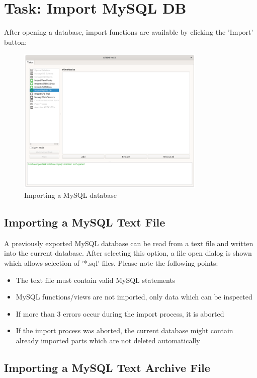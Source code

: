 \section{Task: Import MySQL DB}
\label{sec:task_import_mysql_db}

After opening a database, import functions are available by clicking the 'Import' button:

\begin{figure}[H]
  \center
    \includegraphics[width=9cm,frame]{../screenshots/database_import.png}
  \caption{Importing a MySQL database}
\end{figure}

\subsection{Importing a MySQL Text File}

A previously exported MySQL database can be read from a text file and written into the current database. After selecting this option, a file open dialog is shown which allows selection of '*.sql' files. Please note the following points:

\begin{itemize}  
\item The text file must contain valid MySQL statements
\item MySQL functions/views are not imported, only data which can be inspected
\item If more than 3 errors occur during the import process, it is aborted
\item If the import process was aborted, the current database might contain already imported parts which are not deleted automatically
\end{itemize}

\subsection{Importing a MySQL Text Archive File}

